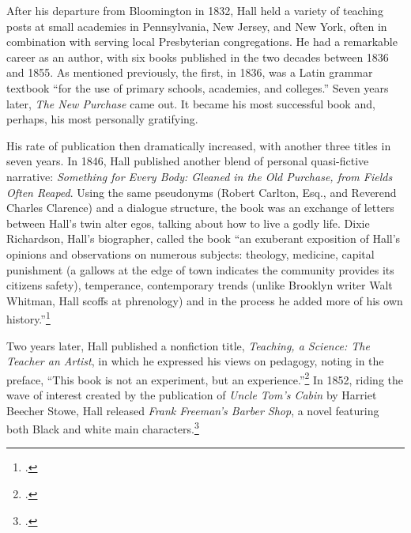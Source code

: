 \documentclass[
  american,
  letterpaper,
]{scrreprt}
\begin{document}
After his departure from Bloomington in 1832, Hall held a variety of
teaching posts at small academies in Pennsylvania, New Jersey, and New
York, often in combination with serving local Presbyterian
congregations. He had a remarkable career as an author, with six books
published in the two decades between 1836 and 1855. As mentioned
previously, the first, in 1836, was a Latin grammar textbook ``for the
use of primary schools, academies, and colleges.'' Seven years later,
\emph{The New Purchase} came out. It became his most successful book
and, perhaps, his most personally gratifying.

His rate of publication then dramatically increased, with another three
titles in seven years. In 1846, Hall published another blend of personal
quasi-fictive narrative: \emph{Something for Every Body: Gleaned in the
Old Purchase, from Fields Often Reaped}. Using the same pseudonyms
(Robert Carlton, Esq., and Reverend Charles Clarence) and a dialogue
structure, the book was an exchange of letters between Hall's twin alter
egos, talking about how to live a godly life. Dixie Richardson, Hall's
biographer, called the book ``an exuberant exposition of Hall's opinions
and observations on numerous subjects: theology, medicine, capital
punishment (a gallows at the edge of town indicates the community
provides its citizens safety), temperance, contemporary trends (unlike
Brooklyn writer Walt Whitman, Hall scoffs at phrenology) and in the
process he added more of his own history.''\footnote{.}

Two years later, Hall published a nonfiction title, \emph{Teaching, a
Science: The Teacher an Artist}, in which he expressed his views on
pedagogy, noting in the preface, ``This book is not an experiment, but
an experience.''\footnote{.} In 1852, riding the wave of interest created by
the publication of \emph{Uncle Tom's Cabin} by Harriet Beecher Stowe,
Hall released \emph{Frank Freeman's Barber Shop}, a novel featuring both
Black and white main characters.\footnote{.}
\end{document}
